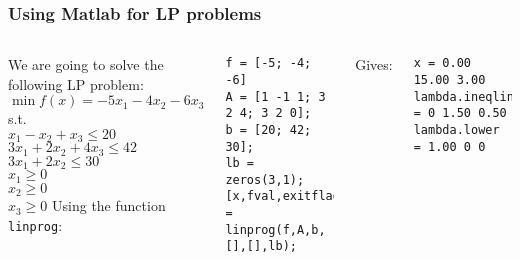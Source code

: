 \begin{frame}[fragile]
  \frametitle{Using Matlab for LP problems}
  \begin{columns}
    We are going to solve the following LP problem:\\
    $\min f(x) = -5x_1 -4x_2 - 6x_3$ \\
    s.t. \\
    $x_1 - x_2 + x_3 \leq 20$ \\
    $3x_1 + 2x_2 + 4x_3 \leq 42$ \\
    $3x_1 + 2x_2 \leq 30$ \\
    $x_1 \geq 0$ \\
    $x_2 \geq 0$ \\
    $x_3 \geq 0$
    Using the function \lstinline$linprog$:
    \begin{lstlisting}
f = [-5; -4; -6]
A = [1 -1 1; 3 2 4; 3 2 0];
b = [20; 42; 30];
lb = zeros(3,1);
[x,fval,exitflag,output,lambda]
= linprog(f,A,b,[],[],lb);
    \end{lstlisting}
Gives:
    \begin{lstlisting}
x = 0.00 15.00 3.00
lambda.ineqlin = 0 1.50 0.50
lambda.lower = 1.00 0 0
    \end{lstlisting}
  \end{columns}
\end{frame}


